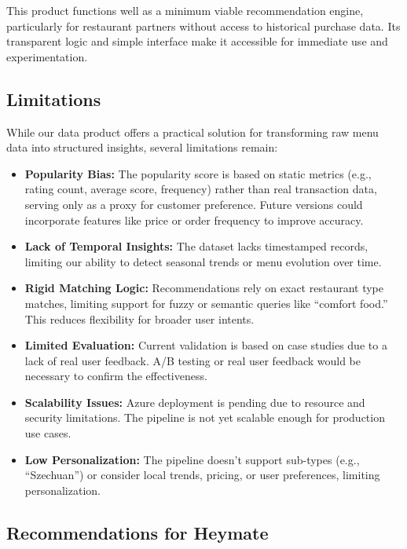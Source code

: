 \documentclass[
  11pt,
  a4paper,
  DIV=11,
  numbers=noendperiod]{scrartcl}
\providecommand{\tightlist}{%
  \setlength{\itemsep}{0pt}\setlength{\parskip}{0pt}}\usepackage{longtable,booktabs,array}
\begin{document}
This product functions well as a minimum viable recommendation engine,
particularly for restaurant partners without access to historical
purchase data. Its transparent logic and simple interface make it
accessible for immediate use and experimentation.

\subsection{Limitations}\label{limitations-1}

While our data product offers a practical solution for transforming raw
menu data into structured insights, several limitations remain:

\begin{itemize}
\tightlist
\item
  \textbf{Popularity Bias:} The popularity score is based on static
  metrics (e.g., rating count, average score, frequency) rather than
  real transaction data, serving only as a proxy for customer
  preference. Future versions could incorporate features like price or
  order frequency to improve accuracy.
\item
  \textbf{Lack of Temporal Insights:} The dataset lacks timestamped
  records, limiting our ability to detect seasonal trends or menu
  evolution over time.
\item
  \textbf{Rigid Matching Logic:} Recommendations rely on exact
  restaurant type matches, limiting support for fuzzy or semantic
  queries like ``comfort food.'' This reduces flexibility for broader
  user intents.
\item
  \textbf{Limited Evaluation:} Current validation is based on case
  studies due to a lack of real user feedback. A/B testing or real user
  feedback would be necessary to confirm the effectiveness.
\item
  \textbf{Scalability Issues:} Azure deployment is pending due to
  resource and security limitations. The pipeline is not yet scalable
  enough for production use cases.
\item
  \textbf{Low Personalization:} The pipeline doesn't support sub-types
  (e.g., ``Szechuan'') or consider local trends, pricing, or user
  preferences, limiting personalization.
\end{itemize}

\subsection{Recommendations for
Heymate}\label{recommendations-for-heymate}
\end{document}
